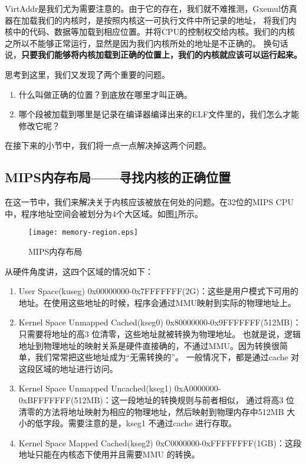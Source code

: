 VirtAddr是我们尤为需要注意的。由于它的存在，我们就不难推测，Gxemul仿真器在加载我们的内核时，是按照内核这一可执行文件中所记录的地址，
将我们内核中的代码、数据等加载到相应位置。并将CPU的控制权交给内核。我们的内核之所以不能够正常运行，显然是因为我们内核所处的地址是不正确的。
换句话说，\textbf{只要我们能够将内核加载到正确的位置上，我们的内核就应该可以运行起来。}

思考到这里，我们又发现了两个重要的问题。
\begin{enumerate}
  \item 什么叫做正确的位置？到底放在哪里才叫正确。
  \item 哪个段被加载到哪里是记录在编译器编译出来的ELF文件里的，我们怎么才能修改它呢？
\end{enumerate}
在接下来的小节中，我们将一点一点解决掉这两个问题。

\subsection{MIPS内存布局——寻找内核的正确位置}
在这一节中，我们来解决关于内核应该被放在何处的问题。在32位的MIPS CPU中，程序地址空间会被划分为4个大区域。如图\ref{fig:memory-region}所示。

\begin{figure}[htbp]
  \centering
  \texttt{[image: memory-region.eps]}
  \caption{MIPS内存布局}\label{fig:memory-region} 
\end{figure}

从硬件角度讲，这四个区域的情况如下：

\begin{enumerate}
  \item User Space(kuseg) 0x00000000-0x7FFFFFFF(2G)：这些是用户模式下可用的地址。在使用这些地址的时候，程序会通过MMU映射到实际的物理地址上。
  \item Kernel Space Unmapped Cached(kseg0) 0x80000000-0x9FFFFFFF(512MB)：只需要将地址的高3 位清零，这些地址就被转换为物理地址。
也就是说，逻辑地址到物理地址的映射关系是硬件直接确的，不通过MMU。因为转换很简单，我们常常把这些地址成为“无需转换的”。
一般情况下，都是通过cache 对这段区域的地址进行访问。
  \item Kernel Space Unmapped Uncached(kseg1) 0xA0000000-0xBFFFFFFF(512MB)：这一段地址的转换规则与前者相似，
通过将高3 位清零的方法将地址映射为相应的物理地址，然后映射到物理内存中512MB 大小的低字段。需要注意的是，kseg1 不通过cache 进行存取。
  \item Kernel Space Mapped Cached(kseg2) 0xC0000000-0xFFFFFFFF(1GB)：这段地址只能在内核态下使用并且需要MMU 的转换。
\end{enumerate}

